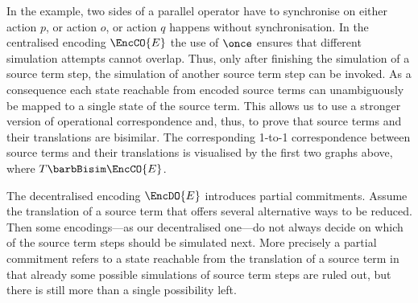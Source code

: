 \documentclass[copyright,creativecommons]{eptcs}
\begin{document}
  \begin{minipage}[c]{0.4\textwidth-2pt}
  \end{minipage}

  In the example, two sides of a parallel operator have to synchronise on either action $p$, or action $o$, or action $q$ happens without synchronisation.
  In the centralised encoding $\EncCO{E}$ the use of $ \once $ ensures that different simulation attempts cannot overlap. Thus, only after finishing the simulation of a source term step, the simulation of another source term step can be invoked. As a consequence each state reachable from encoded source terms can unambiguously be mapped to a single state of the source term. This allows us to use a stronger version of operational correspondence and, thus, to prove that source terms and their translations are bisimilar. The corresponding 1-to-1 correspondence between source terms and their translations is visualised by the first two graphs above, where $ T \barbBisim \EncCO{E} $.

  The decentralised encoding $\EncDO{E}$ introduces partial commitments.
  Assume the translation of a source term that offers several alternative ways to be reduced. Then some encodings---as our decentralised one---do not always decide on which of the source term steps should be simulated next. More precisely a partial commitment refers to a state reachable from the translation of a source term in that already some possible simulations of source term steps are ruled out, but there is still more than a single possibility left.
  
\end{document}
